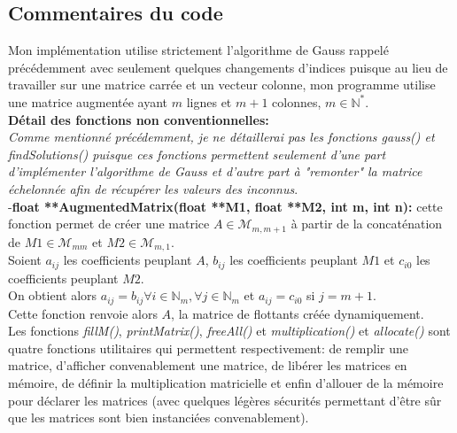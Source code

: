 \subsection{Commentaires du code}
Mon implémentation utilise strictement l'algorithme de Gauss rappelé précédemment avec seulement quelques changements d'indices puisque au lieu de travailler sur une matrice carrée et un vecteur colonne, mon programme utilise une matrice augmentée ayant $m$ lignes et $m+1$ colonnes, $m\in \mathbb{N}^*$. \\
\textbf{Détail des fonctions non conventionnelles:}\\
\textit{Comme mentionné précédemment, je ne détaillerai pas les fonctions \textit{gauss()} et \textit{findSolutions()} puisque ces fonctions permettent seulement d'une part d'implémenter l'algorithme de Gauss et d'autre part à "remonter" la matrice échelonnée afin de récupérer les valeurs des inconnus}. \\
-\textbf{float **AugmentedMatrix(float **M1, float **M2, int m, int n):} cette fonction permet de créer une matrice $A \in \mathcal{M}_{m,m+1}$ à partir de la concaténation de $M1 \in \mathcal{M}_{mm}$ et $M2 \in \mathcal{M}_{m,1}$. \\
Soient $a_{ij}$ les coefficients peuplant $A$, $b_{ij}$ les coefficients peuplant $M1$ et $c_{i0}$ les coefficients peuplant $M2$. \\
On obtient alors $a_{ij} = b_{ij} \forall i \in \mathbb{N}_{m}, \forall j \in \mathbb{N}_{m}$ et $a_{ij} = c_{i0}$ si $j = m+1$. \\
Cette fonction renvoie alors $A$, la matrice de flottants créée dynamiquement. \\
Les fonctions \textit{fillM()}, \textit{printMatrix()}, \textit{freeAll()} et \textit{multiplication()} et \textit{allocate()} sont quatre fonctions utilitaires qui permettent respectivement: de remplir une matrice, d'afficher convenablement une matrice, de libérer les matrices en mémoire, de définir la multiplication matricielle et enfin d'allouer de la mémoire pour déclarer les matrices (avec quelques légères sécurités permettant d'être sûr que les matrices sont bien instanciées convenablement). 
